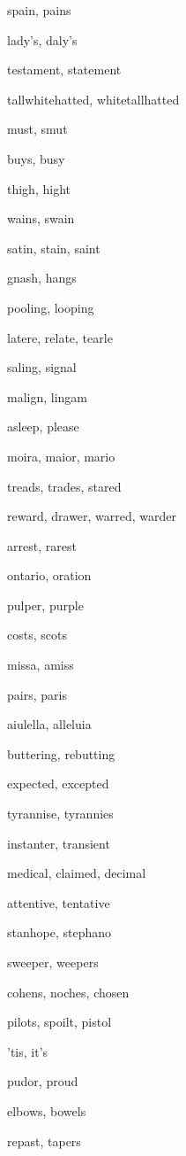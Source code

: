     \item spain, pains
    \item lady's, daly's
    \item testament, statement
    \item tallwhitehatted, whitetallhatted
    \item must, smut
    \item buys, busy
    \item thigh, hight
    \item wains, swain
    \item satin, stain, saint
    \item gnash, hangs
    \item pooling, looping
    \item latere, relate, tearle
    \item saling, signal
    \item malign, lingam
    \item asleep, please
    \item moira, maior, mario
    \item treads, trades, stared
    \item reward, drawer, warred, warder
    \item arrest, rarest
    \item ontario, oration
    \item pulper, purple
    \item costs, scots
    \item missa, amiss
    \item pairs, paris
    \item aiulella, alleluia
    \item buttering, rebutting
    \item expected, excepted
    \item tyrannise, tyrannies
    \item instanter, transient
    \item medical, claimed, decimal
    \item attentive, tentative
    \item stanhope, stephano
    \item sweeper, weepers
    \item cohens, noches, chosen
    \item pilots, spoilt, pistol
    \item 'tis, it's
    \item pudor, proud
    \item elbows, bowels
    \item repast, tapers
